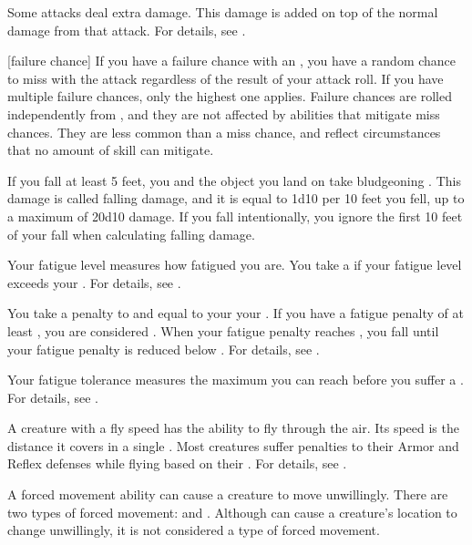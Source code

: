  Some attacks deal extra damage.
This damage is added on top of the normal damage from that attack.
For details, see .

[failure chance] If you have a failure chance with an , you have a random chance to miss with the attack regardless of the result of your attack roll.
If you have multiple failure chances, only the highest one applies.
Failure chances are rolled independently from , and they are not affected by abilities that mitigate miss chances.
They are less common than a miss chance, and reflect circumstances that no amount of skill can mitigate.

 If you fall at least 5 feet, you and the object you land on take bludgeoning .
This damage is called falling damage, and it is equal to 1d10 per 10 feet you fell, up to a maximum of 20d10 damage.
If you fall intentionally, you ignore the first 10 feet of your fall when calculating falling damage.

 Your fatigue level measures how fatigued you are.
You take a  if your fatigue level exceeds your .
For details, see .

 You take a penalty to  and  equal to your  \sub your .
If you have a fatigue penalty of at least , you are considered .
When your fatigue penalty reaches , you fall \unconscious until your fatigue penalty is reduced below .
For details, see .

 Your fatigue tolerance measures the maximum  you can reach before you suffer a .
For details, see .

 A creature with a fly speed has the ability to fly through the air.
Its speed is the distance it covers in a single .
Most creatures suffer penalties to their Armor and Reflex defenses while flying based on their .
For details, see .

 A forced movement ability can cause a creature to move unwillingly.
There are two types of forced movement:  and .
Although  can cause a creature's location to change unwillingly, it is not considered a type of forced movement.


